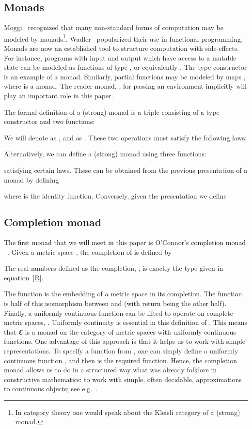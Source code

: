 \documentclass{elsarticle}
\newcommand{\tmstrong}[1]{\textbf{#1}}
\newcommand{\tmtextup}[1]{{\upshape{#1}}}
\newcommand{\complete}{\ensuremath{\mathfrak{C}}}
\newcommand{\id}{\text{{\tmstrong{\tmtextup{I}}}}}
\begin{document}
\subsection{Monads}Moggi~{\cite{moggi:1989}} recognized that many non-standard
forms of computation may be modeled by monads{\footnote{In category theory one
would speak about the Kleisli category of a (strong) monad.}}.
Wadler~{\cite{Wadler92a}} popularized their use in functional programming.
Monads are now an established tool to structure computation with side-effects.
For instance, programs with input  and output  which have access to a
mutable state  can be modeled as functions of type , or equivalently . The type
constructor  is an example of a monad.
Similarly, partial functions may be modeled by maps ,
where  is a monad. The reader monad, , for passing an environment implicitly will play an important
role in this paper.

The formal definition of a (strong) monad is a triple  consisting of a type
constructor  and two functions:

We will denote  as , and  as . These two operations must satisfy the
following laws:

Alternatively, we can define a (strong) monad using three functions:

satisfying certain laws. These can be obtained from the previous presentation
of a monad by defining

where {\id} is the identity function. Conversely, given the 
presentation we define

\subsection{Completion monad\label{ss:completion-monad}}The first monad that
we will meet in this paper is O'Connor's completion monad
~{\cite{OConnor:mscs}}. Given a metric space , the completion of
 is defined by

The real numbers defined as the completion, , is exactly the type given in equation~\ref{R}.

The function  is the
embedding of a metric space in its completion. The function
 is
half of this isomorphism between  and 
(with return being the other half). Finally, a uniformly continuous function
 can be lifted to operate on complete metric spaces,
. Uniformly
continuity is essential in this definition of . This
means that {\complete} is a monad on the category of metric spaces with
uniformly continuous functions. One advantage of this approach is that it
helps us to work with simple representations. To specify a function from
, one can simply define a uniformly
continuous function , and then
 is the required function.
Hence, the completion monad allows us to do in a structured way what was
already folklore in constructive mathematics: to work with simple, often
decidable, approximations to continuous objects; see
e.g.~{\cite{Schwichtenberg}}.
\end{document}
